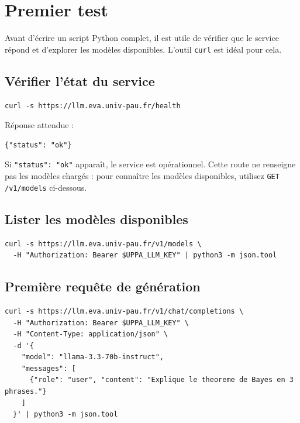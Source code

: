 \documentclass[12pt, a4paper, twoside]{article}
\begin{document}
\section{Premier test}
\label{sec:premier-test}

Avant d'écrire un script Python complet, il est utile de vérifier que le service répond
et d'explorer les modèles disponibles. L'outil \texttt{curl} est idéal pour cela.

\subsection{Vérifier l'état du service}

\begin{lstlisting}[style=bashstyle, caption={Vérification de l'état de santé du service (aucune clé requise)}]
curl -s https://llm.eva.univ-pau.fr/health
\end{lstlisting}

Réponse attendue :
\begin{lstlisting}[style=jsonstyle, caption={Réponse de l'endpoint /health}]
{"status": "ok"}
\end{lstlisting}

Si \texttt{"status": "ok"} apparaît, le service est opérationnel. Cette route ne
renseigne pas les modèles chargés : pour connaître les modèles disponibles, utilisez
\texttt{GET /v1/models} ci-dessous.

\subsection{Lister les modèles disponibles}

\begin{lstlisting}[style=bashstyle, caption={Liste des modèles activés}]
curl -s https://llm.eva.univ-pau.fr/v1/models \
  -H "Authorization: Bearer $UPPA_LLM_KEY" | python3 -m json.tool
\end{lstlisting}

\subsection{Première requête de génération}

\begin{lstlisting}[style=bashstyle, caption={Première requête de génération de texte avec curl}]
curl -s https://llm.eva.univ-pau.fr/v1/chat/completions \
  -H "Authorization: Bearer $UPPA_LLM_KEY" \
  -H "Content-Type: application/json" \
  -d '{
    "model": "llama-3.3-70b-instruct",
    "messages": [
      {"role": "user", "content": "Explique le theoreme de Bayes en 3 phrases."}
    ]
  }' | python3 -m json.tool
\end{lstlisting}
\end{document}

